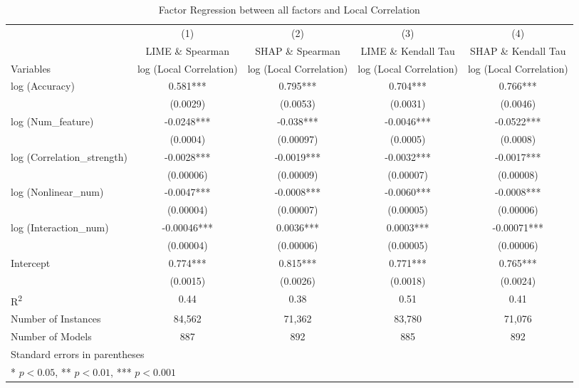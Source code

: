 \documentclass[mnsc,blindrev]{informs3}
\begin{document}
\begin{landscape}
\begin{table}[h]
\centering
\caption{Factor Regression between all factors and Local Correlation}
\begin{tabular}{lcccc}
\toprule
 & (1) & (2) & (3) & (4) \\
 & LIME \& Spearman & SHAP \& Spearman & LIME \& Kendall Tau & SHAP \& Kendall Tau \\

Variables & log (Local Correlation) & log (Local Correlation) & log (Local Correlation) & log (Local Correlation) \\
\midrule
log (Accuracy) & 0.581*** & 0.795*** & 0.704*** & 0.766*** \\
 & (0.0029) & (0.0053) & (0.0031) & (0.0046) \\
log (Num\_feature) & -0.0248*** & -0.038*** & -0.0046*** & -0.0522*** \\
 & (0.0004) & (0.00097) & (0.0005) & (0.0008) \\
log (Correlation\_strength) & -0.0028*** & -0.0019*** & -0.0032*** & -0.0017*** \\
 & (0.00006) & (0.00009) & (0.00007) & (0.00008) \\
log (Nonlinear\_num) & -0.0047*** & -0.0008*** & -0.0060*** & -0.0008*** \\
 & (0.00004) & (0.00007) & (0.00005) & (0.00006) \\
log (Interaction\_num) & -0.00046*** & 0.0036*** & 0.0003*** & -0.00071*** \\
 & (0.00004) & (0.00006) & (0.00005) & (0.00006) \\
Intercept & 0.774*** & 0.815*** & 0.771*** & 0.765*** \\
 & (0.0015) & (0.0026) & (0.0018) & (0.0024) \\
\midrule
R\textsuperscript{2} & 0.44 & 0.38 & 0.51 & 0.41 \\
Number of Instances & 84,562 & 71,362 & 83,780 & 71,076 \\
Number of Models & 887 & 892 & 885 & 892 \\
\bottomrule
\multicolumn{5}{l}{Standard errors in parentheses} \\
\multicolumn{5}{l}{* $p<0.05$, ** $p<0.01$, *** $p<0.001$} \\
\end{tabular}
\end{table}
\end{landscape}
\end{document}
